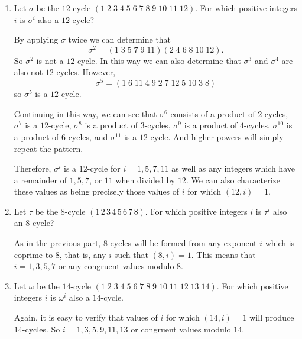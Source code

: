 \begin{enumerate}
\item Let $\sigma$ be the $12$-cycle
  $(1\;2\;3\;4\;5\;6\;7\;8\;9\;10\;11\;12)$. For which positive
  integers $i$ is $\sigma^i$ also a $12$-cycle?
  \begin{solution}
    By applying $\sigma$ twice we can determine that
    \begin{equation*}
      \sigma^2 = (1\;3\;5\;7\;9\;11)(2\;4\;6\;8\;10\;12).
    \end{equation*}
    So $\sigma^2$ is not a $12$-cycle. In this way we can also
    determine that $\sigma^3$ and $\sigma^4$ are also not
    $12$-cycles. However,
    \begin{equation*}
      \sigma^5 = (1\;6\;11\;4\;9\;2\;7\;12\;5\;10\;3\;8)
    \end{equation*}
    so $\sigma^5$ is a $12$-cycle.

    Continuing in this way, we can see that $\sigma^6$ consists of a
    product of $2$-cycles, $\sigma^7$ is a $12$-cycle, $\sigma^8$ is a
    product of $3$-cycles, $\sigma^9$ is a product of $4$-cycles,
    $\sigma^{10}$ is a product of $6$-cycles, and $\sigma^{11}$ is a
    $12$-cycle. And higher powers will simply repeat the pattern.

    Therefore, $\sigma^i$ is a $12$-cycle for $i = 1,5,7,11$ as well
    as any integers which have a remainder of $1,5,7$, or $11$ when
    divided by $12$. We can also characterize these values as being
    precisely those values of $i$ for which $(12,i) = 1$.
  \end{solution}
\item Let $\tau$ be the $8$-cycle $(1\,2\,3\,4\,5\,6\,7\,8)$. For
  which positive integers $i$ is $\tau^i$ also an $8$-cycle?
  \begin{solution}
    As in the previous part, $8$-cycles will be formed from any
    exponent $i$ which is coprime to $8$, that is, any $i$ such that
    $(8,i) = 1$. This means that $i = 1,3,5,7$ or any congruent values
    modulo $8$.
  \end{solution}
\item Let $\omega$ be the $14$-cycle
  $(1\;2\;3\;4\;5\;6\;7\;8\;9\;10\;11\;12\;13\;14)$. For which
  positive integers $i$ is $\omega^i$ also a $14$-cycle.
  \begin{solution}
    Again, it is easy to verify that values of $i$ for which
    $(14,i) = 1$ will produce $14$-cycles. So $i = 1,3,5,9,11,13$ or
    congruent values modulo $14$.
  \end{solution}
\end{enumerate}
